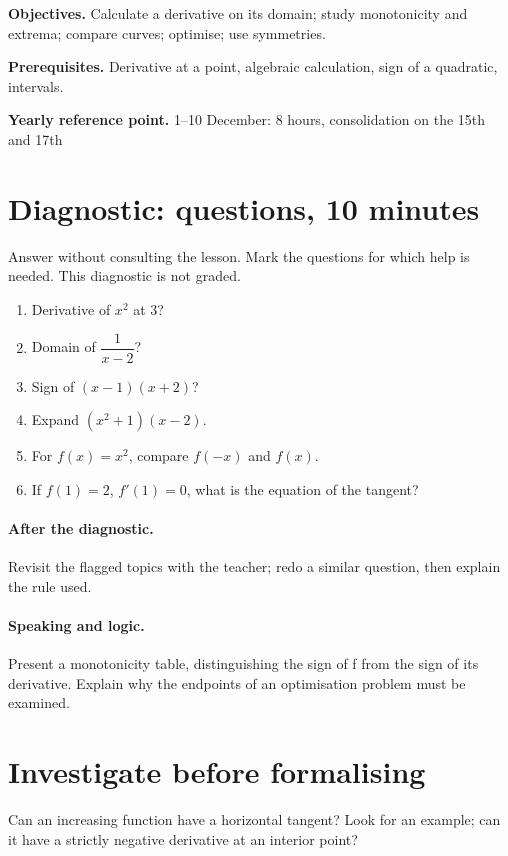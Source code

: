 \label{C06}
\begin{keypoint}
\textbf{Objectives.} Calculate a derivative on its domain; study monotonicity and extrema; compare curves; optimise; use symmetries.

\textbf{Prerequisites.} Derivative at a point, algebraic calculation, sign of a quadratic, intervals.

\textbf{Yearly reference point.} 1--10 December: 8 hours, consolidation on the 15th and 17th\end{keypoint}
\section*{Diagnostic:  questions, 10 minutes}\label{C06-D}
Answer without consulting the lesson. Mark the questions for which help is needed. This diagnostic is not graded.
\begin{enumerate}
\item Derivative of $x^2$ at 3?
\item Domain of $\dfrac{1}{x-2}$?
\item Sign of $(x-1)(x+2)$?
\item Expand $(x^2+1)(x-2)$.
\item For $f(x)=x^2$, compare $f(-x)$ and $f(x)$.
\item If $f(1)=2$, $f\prime(1)=0$, what is the equation of the tangent?
\end{enumerate}
\paragraph{After the diagnostic.} Revisit the flagged topics with the teacher; redo a similar question, then explain the rule used.
\paragraph{Speaking and logic.} Present a monotonicity table, distinguishing the sign of f from the sign of its derivative. Explain why the endpoints of an optimisation problem must be examined.
\mxnewpage
\section*{Investigate before formalising}\label{C06-RECH}
Can an increasing function have a horizontal tangent? Look for an example; can it have a strictly negative derivative at an interior point?
